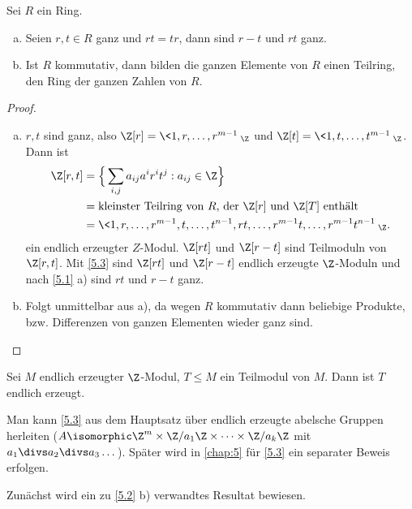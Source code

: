 \begin{st} \label{5.2}
	Sei $R$ ein Ring.
	\begin{enumerate}[a)]
		\item
			Seien $r, t \in R$ ganz und $rt = tr$, dann sind $r - t$ und $rt$ ganz.
		\item
			Ist $R$ kommutativ, dann bilden die ganzen Elemente von $R$ einen Teilring, den Ring der ganzen Zahlen von $R$.
	\end{enumerate}
	\begin{proof}
		\begin{enumerate}[a)]
			\item
				$r, t$ sind ganz, also $\Z[r] = \<1, r, \dotsc, r^{m-1}\>_\Z$ und $\Z[t] = \<1, t, \dotsc, t^{m-1}\>_\Z$.
				Dann ist
				\begin{align*}
					\Z[r, t] &= \Big\{ \sum_{i,j} a_{ij} a^i r^i t^j : a_{ij} \in \Z \Big\} \\
					&= \text{kleinster Teilring von $R$, der $\Z[r]$ und $\Z[T]$ enthält} \\
					&= \<1, r, \dotsc, r^{m-1}, t, \dotsc, t^{n-1}, rt, \dotsc, r^{m-1}t, \dotsc, r^{m-1}t^{n-1}\>_\Z.
				\end{align*}
				ein endlich erzeugter $Z$-Modul.
				$\Z[rt]$ und $\Z[r-t]$ sind Teilmoduln von $\Z[r,t]$.
				Mit \ref{5.3} sind $\Z[rt]$ und $\Z[r-t]$ endlich erzeugte $\Z$-Moduln und nach \ref{5.1} a) sind $rt$ und $r-t$ ganz.
			\item
				Folgt unmittelbar aus a), da wegen $R$ kommutativ dann beliebige Produkte, bzw. Differenzen von ganzen Elementen wieder ganz sind.
		\end{enumerate}
	\end{proof}
\end{st}

\begin{st} \label{5.3}
	Sei $M$ endlich erzeugter $\Z$-Modul, $T \le M$ ein Teilmodul von $M$.
	Dann ist $T$ endlich erzeugt.
	\begin{note}
		Man kann \ref{5.3} aus dem Hauptsatz über endlich erzeugte abelsche Gruppen herleiten ($A \isomorphic \Z^m \times \Z / a_1 \Z \times \dotsb \times \Z / a_k \Z$ mit $a_1 \divs a_2 \divs a_3 \dotsc$).
		Später wird in \ref{chap:5} für \ref{5.3} ein separater Beweis erfolgen.

		Zunächst wird ein zu \ref{5.2} b) verwandtes Resultat bewiesen.
	\end{note}
\end{st}

